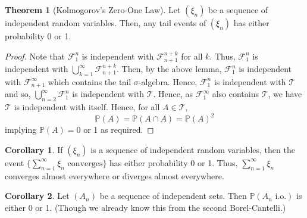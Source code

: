 \documentclass[]{article}
\theoremstyle{definition}
\newtheorem{theorem}{Theorem}
\newtheorem{corollary}{Corollary}[theorem]
\theoremstyle{definition}
\begin{document}
\begin{theorem}[Kolmogorov's Zero-One Law]
  Let \((\xi_n)\) be a sequence of independent random variables. Then, any tail 
  events of \((\xi_n)\) has either probability 0 or 1.
\end{theorem}
\begin{proof}
  Note that \(\mathcal{F}_1^n\) is independent with \(\mathcal{F}_{n + 1}^{n + k}\) 
  for all \(k\). Thus, \(\mathcal{F}_1^n\) is independent with 
  \(\bigcup_{k = 1}^\infty \mathcal{F}_{n+ 1}^{n + k}\). Then, by the above lemma, 
  \(\mathcal{F}_1^n\) is independent with \(\mathcal{F}_{n + 1}^\infty\)
  which contains the tail \(\sigma\)-algebra. Hence, \(\mathcal{F}_1^n\) is
  independent with \(\mathcal{T}\) and so, \(\bigcup_{n = 2}^\infty\mathcal{F}_1^n\) 
  is independent with \(\mathcal{T}\). Hence, as \(\mathcal{F}_1^\infty\) also 
  contains \(\mathcal{T}\), we have \(\mathcal{T}\) is independent with itself.
  Hence, for all \(A \in \mathcal{T}\), 
  \[\mathbb{P}(A) = \mathbb{P}(A \cap A) = \mathbb{P}(A)^2\]
  implying \(\mathbb{P}(A) = 0\) or 1 as required.
\end{proof}

\begin{corollary}
  If \((\xi_n)\) is a sequence of independent random variables, then the event
  \(\{\sum_{n = 1}^\infty \xi_n \text{ converges}\}\) has either probability 0 
  or 1. Thus, \(\sum_{n = 1}^\infty \xi_n\) converges almost everywhere or 
  diverges almost everywhere.
\end{corollary}

\begin{corollary}
  Let \((A_n)\) be a sequence of independent sets. Then 
  \(\mathbb{P}(A_n \text{ i.o.})\) is either 0 or 1. (Though we already 
  know this from the second Borel-Cantelli.)
\end{corollary}
\end{document}

